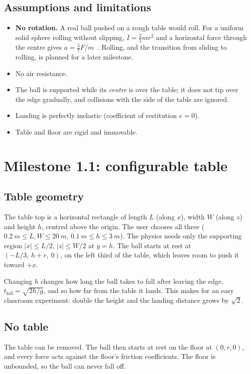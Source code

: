 \documentclass[11pt]{article}
\begin{document}
\subsection{Assumptions and limitations}
\begin{itemize}
  \item \textbf{No rotation.} A real ball pushed on a rough table would roll. For a uniform
        solid sphere rolling without slipping, $I = \tfrac25 m r^2$ and a horizontal force through
        the centre gives $a = \tfrac{5}{7}F/m$~\cite{kleppner2014}. Rolling, and the transition
        from sliding to rolling, is planned for a later milestone.
  \item No air resistance.
  \item The ball is supported while its \emph{centre} is over the table; it does not tip
        over the edge gradually, and collisions with the side of the table are ignored.
  \item Landing is perfectly inelastic (coefficient of restitution $e=0$).
  \item Table and floor are rigid and immovable.
\end{itemize}

\section{Milestone 1.1: configurable table}
\subsection{Table geometry}
The table top is a horizontal rectangle of length $L$ (along $x$), width $W$ (along $z$) and height $h$,
centred above the origin. The user chooses all three
($\SI{0.2}{m}\le L, W\le\SI{20}{m}$, $\SI{0.1}{m}\le h\le\SI{3}{m}$). The physics needs only the
supporting region $|x|\le L/2$, $|z|\le W/2$ at $y=h$. The ball starts at rest at
$(-L/3,\ h+r,\ 0)$, on the left third of the table, which leaves room to push it toward $+x$.

Changing $h$ changes how long the ball takes to fall after leaving the edge,
$t_\text{fall}=\sqrt{2h/g}$, and so how far from the table it lands. This makes for an easy
classroom experiment: double the height and the landing distance grows by $\sqrt2$.

\subsection{No table}
The table can be removed. The ball then starts at rest on the floor at $(0, r, 0)$, and every
force acts against the floor's friction coefficients. The floor is unbounded, so the ball can never
fall off.
\end{document}
